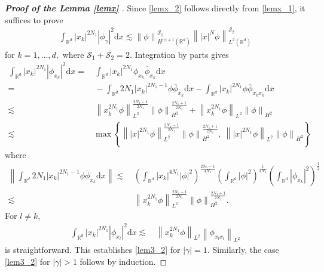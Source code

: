 \documentclass[10pt,twoside,a4paper]{article}
\numberwithin{equation}{section}\allowdisplaybreaks
\begin{document}
\begin{appendices}
 
		\begin{proof} [\textbf{Proof of the Lemma \ref{lemx} }] Since \eqref{lemx_2} follows directly from \eqref{lemx_1}, it suffices to prove
			\begin{align}  \label{lem3_2}
				\int_{\mathbb{R}^d} |x_k|^{2N_1}|\phi_\gamma|^2 \mathrm{d} x\lesssim \left\|\phi\right\|_{H^{|\gamma|+1}(\mathbb{R}^d)}^{\mathscr{S}_1} \left\||x|^N \phi\right\|_{L^2(\mathbb{R}^d)}^{\mathscr{S}_2}
			\end{align}
		for $ k=1,\ldots,d, $ where $ \mathscr{S}_1+\mathscr{S}_2=2 $.
			Integration by parts gives
			\begin{align*}
				\int_{\mathbb{R}^d} |x_k|^{2N_1}|\phi_{x_k}|^2 \mathrm{d} x=&\,		\int_{\mathbb{R}^d} |x_k|^{2N_1}\phi_{x_k} \overline{\phi}_{x_k} \mathrm{d} x\\
				=&\,-	\int_{\mathbb{R}^d} 2N_1|x_k|^{2N_1-1}\phi \overline{\phi}_{x_k} \mathrm{d} x-	\int_{\mathbb{R}^d} |x_k|^{2N_1}\phi \overline{\phi}_{x_kx_k} \mathrm{d} x\\
				\lesssim &\,\left\| x_k^{2N_1}\phi \right\|_{L^2}^{\frac{2N_1-1}{2N_1}}\left\|\phi \right\|_{H^2}^{\frac{2N_1+1}{2N_1}}+ \left\| x_k^{2N_1}\phi \right\|_{L^2}\left\|\phi \right\|_{H^2}\\
				\lesssim&\max\left\{\left\| |x|^{2N_1}\phi \right\|_{L^2}^{\frac{2N_1-1}{2N_1}}\left\|\phi \right\|_{H^2}^{\frac{2N_1+1}{2N_1}}, ~\left\| |x|^{2N_1}\phi \right\|_{L^2}\left\|\phi \right\|_{H^2} \right\}
			\end{align*}
			where 
			\begin{align*}
				\left\| \int_{\mathbb{R}^d} 2N_1|x_k|^{2N_1-1}\phi \overline{\phi}_{x_k} \mathrm{d} x\right\|\lesssim &\,\left(\int_{\mathbb{R}^{d}} |x_k|^{4N_1}|\phi|^2\right)^{\frac{2N_1-1}{4N_1}} \left( \int_{\mathbb{R}^{d}} |\phi|^2\right)^{\frac{1}{4N_1}}\left( \int_{\mathbb{R}^{d}} |\phi_{x_k}|^2\right)^{\frac{1}{2}}\\
				\lesssim &\,\left\| x_k^{2N_1}\phi \right\|_{L^2}^{\frac{2N_1-1}{2N_1}}\left\|\phi \right\|_{H^2}^{\frac{2N_1+1}{2N_1}}.
			\end{align*}	
		For $ l\neq k $,
			\begin{align*}
				\int_{\mathbb{R}^d} |x_k|^{2N_1}|\phi_{x_l}|^2 \mathrm{d} x\lesssim &\, \left\| x_k^{2N_1}\phi \right\|_{L^2}\left\|\phi_{x_lx_l} \right\|_{L^2}
			\end{align*}
			is straightforward.  This establishes \eqref{lem3_2} for $ |\gamma|=1. $    Similarly, the case   \eqref{lem3_2} for $ |\gamma|>1 $ follows by induction. 
		\end{proof}


\end{appendices}
\end{document}
